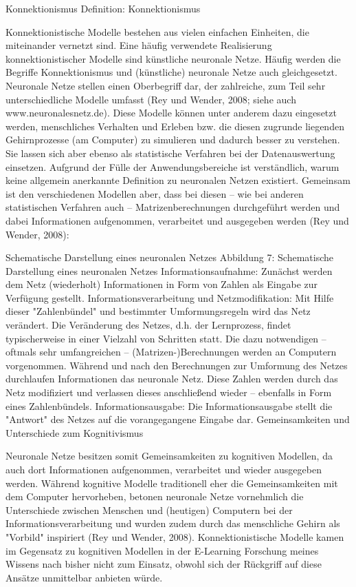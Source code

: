 \documentclass[a4paper, 12pt, twoside, BCOR=20mm, DIV=calc, abstracton, parskip=half*, toc=bibliography, toc=listof, headsepline, footsepline, headings=small, numbers=enddot]{scrreprt}
\begin{document}
	Konnektionismus
	Definition: Konnektionismus
	
	Konnektionistische Modelle bestehen aus vielen einfachen Einheiten, die miteinander vernetzt sind. Eine häufig verwendete Realisierung konnektionistischer Modelle sind künstliche neuronale Netze. Häufig werden die Begriffe Konnektionismus und (künstliche) neuronale Netze auch gleichgesetzt. Neuronale Netze stellen einen Oberbegriff dar, der zahlreiche, zum Teil sehr unterschiedliche Modelle umfasst (Rey und Wender, 2008; siehe auch www.neuronalesnetz.de). Diese Modelle können unter anderem dazu eingesetzt werden, menschliches Verhalten und Erleben bzw. die diesen zugrunde liegenden Gehirnprozesse (am Computer) zu simulieren und dadurch besser zu verstehen. Sie lassen sich aber ebenso als statistische Verfahren bei der Datenauswertung einsetzen. Aufgrund der Fülle der Anwendungsbereiche ist verständlich, warum keine allgemein anerkannte Definition zu neuronalen Netzen existiert. Gemeinsam ist den verschiedenen Modellen aber, dass bei diesen – wie bei anderen statistischen Verfahren auch – Matrizenberechnungen durchgeführt werden und dabei Informationen aufgenommen, verarbeitet und ausgegeben werden (Rey und Wender, 2008):
	
	Schematische Darstellung eines neuronalen Netzes
	Abbildung 7: Schematische Darstellung eines neuronalen Netzes
	Informationsaufnahme: Zunächst werden dem Netz (wiederholt) Informationen in Form von Zahlen als Eingabe zur Verfügung gestellt.
	Informationsverarbeitung und Netzmodifikation: Mit Hilfe dieser "Zahlenbündel" und bestimmter Umformungsregeln wird das Netz verändert. Die Veränderung des Netzes, d.h. der Lernprozess, findet typischerweise in einer Vielzahl von Schritten statt. Die dazu notwendigen – oftmals sehr umfangreichen – (Matrizen-)Berechnungen werden an Computern vorgenommen. Während und nach den Berechnungen zur Umformung des Netzes durchlaufen Informationen das neuronale Netz. Diese Zahlen werden durch das Netz modifiziert und verlassen dieses anschließend wieder – ebenfalls in Form eines Zahlenbündels.
	Informationsausgabe: Die Informationsausgabe stellt die "Antwort" des Netzes auf die vorangegangene Eingabe dar.
	Gemeinsamkeiten und Unterschiede zum Kognitivismus
	
	Neuronale Netze besitzen somit Gemeinsamkeiten zu kognitiven Modellen, da auch dort Informationen aufgenommen, verarbeitet und wieder ausgegeben werden. Während kognitive Modelle traditionell eher die Gemeinsamkeiten mit dem Computer hervorheben, betonen neuronale Netze vornehmlich die Unterschiede zwischen Menschen und (heutigen) Computern bei der Informationsverarbeitung und wurden zudem durch das menschliche Gehirn als "Vorbild" inspiriert (Rey und Wender, 2008). Konnektionistische Modelle kamen im Gegensatz zu kognitiven Modellen in der E-Learning Forschung meines Wissens nach bisher nicht zum Einsatz, obwohl sich der Rückgriff auf diese Ansätze unmittelbar anbieten würde.
	
\end{document}
